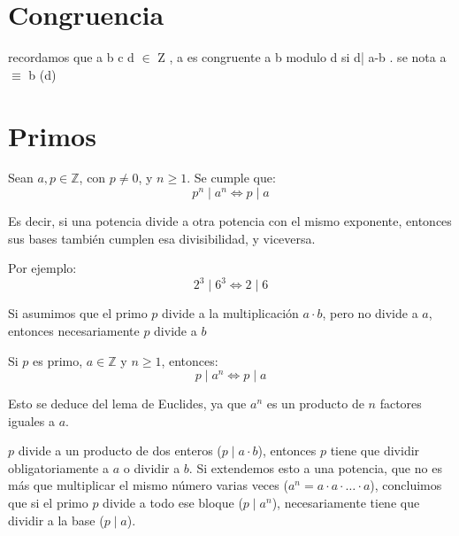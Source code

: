 \section{Congruencia}
\begin{definicion}
    recordamos que a b c d $\in$ Z , a es congruente a b modulo d si d| a-b . se nota a $\equiv$ b (d) 
\end{definicion}

\section{Primos} 
\begin{teoria}[title=Potencias con igual exponente]
    Sean $a,p \in \mathbb{Z}$, con $p \neq 0$,
    y $n \geq 1$. Se cumple que:
    \[
        \boxed{p^n \mid a^n \iff p \mid a}
    \]

    Es decir, si una potencia divide a otra potencia
    con el mismo exponente, entonces sus bases
    también cumplen esa divisibilidad, y viceversa.

\end{teoria}
\begin{ejemplo}
        Por ejemplo:
    \[
        2^3 \mid 6^3 \iff 2 \mid 6
    \]
\end{ejemplo}
\begin{teoria}[title=Propiedades de los primos: Euclides]
\begin{listapropiedades}
  \item[lema euclides] Si asumimos que el primo $p$ divide a la multiplicación $a \cdot b$, pero no divide a $a$, entonces necesariamente $p$ divide a $b$
  \item[corolario del lema de euclides]
    Si $p$ es primo, $a \in \mathbb{Z}$ y $n \geq 1$,
    entonces:
    \[
        \boxed{p \mid a^n \iff p \mid a}
    \]

    Esto se deduce del lema de Euclides, ya que
    $a^n$ es un producto de $n$ factores iguales
    a $a$.
  
  $p$ divide a un producto de dos enteros 
  ($p \mid a \cdot b$), entonces $p$ tiene que dividir obligatoriamente a 
  $a$ o dividir a $b$. Si extendemos esto a una potencia, 
  que no es más que multiplicar el mismo número varias veces ($a^n = a \cdot a \cdot \dots \cdot a$), concluimos que si el primo $p$ divide a todo ese bloque ($p \mid a^n$), necesariamente tiene que dividir a la base ($p \mid a$).
\end{listapropiedades}
\end{teoria}

